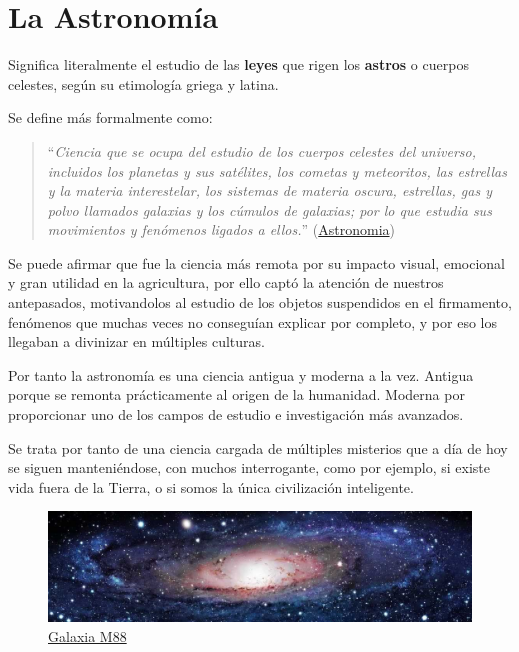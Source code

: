 \section{La Astronomía}

\bigskip
Significa literalmente el estudio de las \textbf{leyes} que rigen los \textbf{astros} o cuerpos celestes, según su etimología griega y latina.

\bigskip
Se define más formalmente como:

\begin{quote}``\textit{Ciencia que se ocupa del estudio de los cuerpos celestes del universo, incluidos los planetas y sus satélites, los cometas y meteoritos, las estrellas y la materia interestelar,
  los sistemas de materia oscura, estrellas, gas y polvo llamados galaxias y los cúmulos de galaxias; por lo que estudia sus movimientos y fenómenos ligados a ellos.}''
\newline(\href{https://es.wikipedia.org/wiki/Astronom%C3%ADa}{Astronomia})
\end{quote}

\bigskip
Se puede afirmar que fue la ciencia más remota por su impacto visual, emocional y gran utilidad en la agricultura, por ello captó la atención de nuestros antepasados, motivandolos al estudio de los objetos suspendidos en el firmamento, fenómenos que muchas veces no conseguían explicar por completo, y por eso los llegaban a divinizar en múltiples culturas.

\bigskip
Por tanto la  astronomía es una ciencia antigua y moderna a la vez. \newline
Antigua porque se remonta prácticamente al origen de la humanidad.\newline
Moderna por proporcionar uno de los campos de estudio e investigación más avanzados.

\bigskip
Se trata por tanto de una ciencia cargada de múltiples misterios que a día de hoy se siguen manteniéndose, con muchos interrogante, como por ejemplo,  si existe vida fuera de la Tierra, o si somos la única civilización
inteligente.


\begin{figure}[b]
\centering
\includegraphics[width=0.9\linewidth]{../images/astrofooter}
\caption[Galaxia M88]{\href{https://commons.wikimedia.org/wiki/File:Messier_88_galaxy.jpg}{Galaxia M88}}
\label{fig:astrofooter}
\end{figure}


